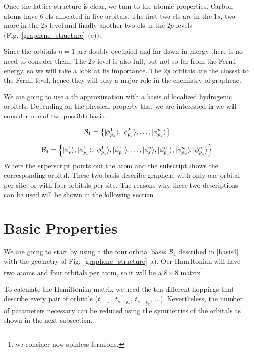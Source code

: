 Once the lattice structure is clear, we turn to the atomic properties. Carbon atoms have 6 \acp{el} allocated in five orbitals. The first two \acp{el} are in the $1s$, two more in the $2s$ level and finally another two \acp{el} in the $2p$ levels (Fig.~\ref{graphene_structure}~(e)).

Since the orbitals $n=1$ are doubly occupied and far down in energy there is no need to consider them. The $2s$ level is also full, but not so far from the Fermi energy, so we will take a look at its importance. The $2p$ orbitals are the closest to the Fermi level, hence they will play a major role in the chemistry of graphene.

We are going to use a \ac{tb} approximation with a basis of localized hydrogenic orbitals. Depending on the physical property that we are interested in we will consider one of two possible basis.

\begin{equation}
  \mathcal{B}_1 = \left\{|\phi^1_{p_z}\rangle, |\phi^2_{p_z}\rangle,\dots, |\phi^n_{p_z}\rangle\right\}
\label{basis1}
\end{equation}

\begin{equation}
  \mathcal{B}_4 = \left\{
  |\phi^1_{s}\rangle,|\phi^1_{p_x}\rangle,|\phi^1_{p_y}\rangle,|\phi^1_{p_z}\rangle,
  \dots,
  |\phi^n_{s}\rangle,|\phi^n_{p_x}\rangle,|\phi^n_{p_y}\rangle,|\phi^n_{p_z}\rangle
  \right\}
\label{basis4}
\end{equation}
Where the superscript points out the atom and the subscript shows the corresponding orbital.
These two basis describe graphene with only one orbital per site, or with four orbitals per site. The reasons why these two descriptions can be used will be shown in the following section %

\section{Basic Properties}
\label{sec:graphene_basic_properties}
We are going to start by using a the four orbital basis $\mathcal{B}_4$ described in \eqref{basis4} with the geometry of Fig.~\ref{graphene_structure}~a). Our Hamiltonian will have two atoms and four orbitals per atom, so it will be a $8\times8$ matrix\footnote{we consider now spinless fermions.}

To calculate the Hamiltonian matrix we need the ten different hoppings that describe every pair of orbitals ($t_{s-s}$, $t_{s-p_x}$, $t_{s-p_y}$, ...). Nevertheless, the number of parameters necessary can be reduced using the symmetries of the orbitals as shown in the next subsection.


